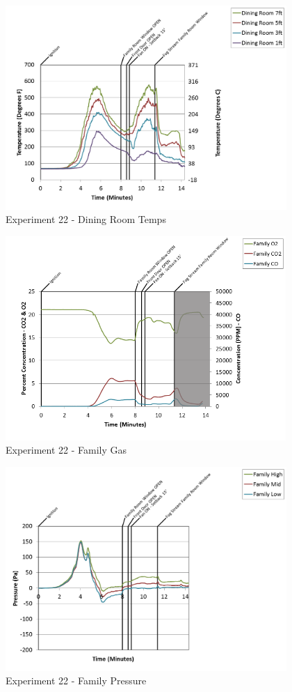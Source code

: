 \documentclass{article}
\begin{document}
\begin{appendices}
\clearpage

\begin{figure}[h!]
	\centering
	\includegraphics[height=3.05in]{0_Images/Results_Charts/Exp_22_Charts/DiningRoomTemps.png}
	\caption{Experiment 22 - Dining Room Temps}
\end{figure}


\begin{figure}[h!]
	\centering
	\includegraphics[height=3.05in]{0_Images/Results_Charts/Exp_22_Charts/FamilyGas.png}
	\caption{Experiment 22 - Family Gas}
\end{figure}

\clearpage

\begin{figure}[h!]
	\centering
	\includegraphics[height=3.05in]{0_Images/Results_Charts/Exp_22_Charts/FamilyPressure.png}
	\caption{Experiment 22 - Family Pressure}
\end{figure}



\end{appendices}
\end{document}
